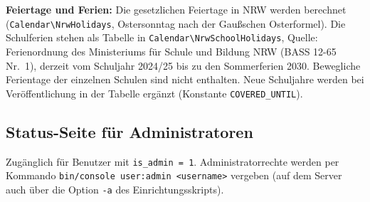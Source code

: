 \documentclass[a4paper,fontsize=10pt]{scrartcl}
\newcommand{\code}[1]{\texttt{#1}}
\begin{document}
\textbf{Feiertage und Ferien:} Die gesetzlichen Feiertage in NRW werden
berechnet (\code{Calendar\textbackslash NrwHolidays}, Ostersonntag nach der
Gaußschen Osterformel). Die Schulferien stehen als Tabelle in
\code{Calendar\textbackslash NrwSchoolHolidays}, Quelle: Ferienordnung des
Ministeriums für Schule und Bildung NRW (BASS 12-65 Nr.~1), derzeit vom
Schuljahr 2024/25 bis zu den Sommerferien 2030. Bewegliche Ferientage der
einzelnen Schulen sind nicht enthalten. Neue Schuljahre werden bei
Veröffentlichung in der Tabelle ergänzt (Konstante \code{COVERED\_UNTIL}).

\subsection{Status-Seite für Administratoren}

Zugänglich für Benutzer mit \code{is\_admin = 1}. Administratorrechte werden
per Kommando \code{bin/console user:admin <username>} vergeben (auf dem
Server auch über die Option \code{-a} des Einrichtungsskripts).
\end{document}
